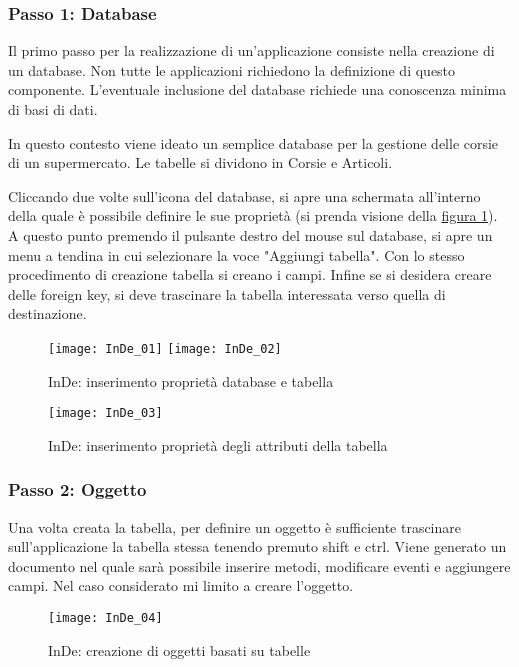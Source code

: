 \subsubsection{Passo 1: Database} 
Il primo passo per la realizzazione di un'applicazione consiste nella creazione di un database. 
Non tutte le applicazioni richiedono la definizione di questo componente. 
L'eventuale inclusione del database richiede una conoscenza minima di basi di dati. 

In questo contesto viene ideato un semplice database per la gestione delle corsie di un supermercato. Le tabelle si dividono in Corsie e Articoli.

Cliccando due volte sull'icona del database, si apre una schermata all'interno della quale è possibile definire le sue proprietà (si prenda visione della \hyperref[InDe_Db_proprietà db_t]{figura \ref{InDe_Db_proprietà db_t}}). A questo punto premendo il pulsante destro del mouse sul database, si apre un menu a tendina in cui selezionare la voce "Aggiungi tabella". Con lo stesso procedimento di creazione tabella si creano i campi.
Infine se si desidera creare delle foreign key, si deve trascinare la tabella interessata verso quella di destinazione.  

\begin{figure}[!h] 
	\centering 
	\texttt{[image: InDe\_01]} 
	\texttt{[image: InDe\_02]} 
	\caption{InDe: inserimento proprietà database e tabella}
	\label{InDe_Db_proprietà db_t}
\end{figure}

\begin{figure}[!h] 
	\centering  
	\texttt{[image: InDe\_03]} 
	\caption{InDe: inserimento proprietà degli attributi della tabella}
	\label{InDe_Db_proprietà_a}
\end{figure}


\subsubsection{Passo 2: Oggetto}
Una volta creata la tabella, per definire un oggetto è sufficiente trascinare sull'applicazione la tabella stessa tenendo premuto shift e ctrl. Viene generato un documento nel quale sarà possibile inserire metodi, modificare eventi e aggiungere campi. Nel caso considerato mi limito a creare l'oggetto.

\begin{figure}[!h] 
	\centering  
	\texttt{[image: InDe\_04]} 
	\caption{InDe: creazione di oggetti basati su tabelle}
	\label{InDe_Oggetti}
\end{figure}

